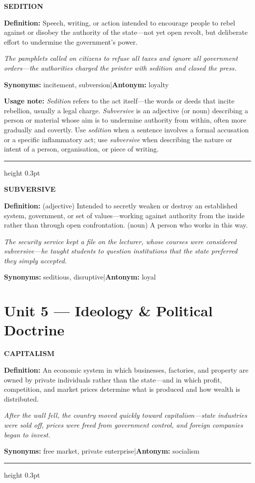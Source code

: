 \documentclass[11pt, a4paper]{article}
\newcommand{\wordentry}[2]{%
  \vspace{0.9em}%
  {\large\bfseries #1}%
  \quad{\itshape\color{posgray}(#2)}%
  \par\vspace{0.15em}%
}
\newcommand{\definition}[1]{%
  \textbf{Definition:} #1\par%
}
\newcommand{\examplesentence}[1]{%
  \begin{mdframed}[
    backgroundcolor=exampletan,
    linewidth=0pt,
    innerleftmargin=8pt,
    innerrightmargin=8pt,
    innertopmargin=5pt,
    innerbottommargin=5pt,
    skipabove=3pt,
    skipbelow=3pt
  ]
  \small\itshape #1
  \end{mdframed}%
}
\newcommand{\synantline}[2]{%
  \vspace{0.2em}%
  \textbf{Synonyms:} #1\quad|\quad\textbf{Antonym:} #2\par%
}
\newcommand{\usagenote}[1]{%
  \begin{mdframed}[
    backgroundcolor=notebg,
    linecolor=noteborder,
    linewidth=1pt,
    innerleftmargin=8pt,
    innerrightmargin=8pt,
    innertopmargin=5pt,
    innerbottommargin=5pt,
    skipabove=4pt,
    skipbelow=4pt
  ]
  \small\textbf{Usage note:} #1
  \end{mdframed}%
}
\newcommand{\entryrule}{%
  \vspace{0.3em}%
  {\color{posgray}\hrule height 0.3pt}%
  \vspace{0.3em}%
}
\begin{document}
\wordentry{SEDITION}{noun}
\definition{Speech, writing, or action intended to encourage people to rebel against or disobey the authority of the state---not yet open revolt, but deliberate effort to undermine the government's power.}
\examplesentence{The pamphlets called on citizens to refuse all taxes and ignore all government orders---the authorities charged the printer with sedition and closed the press.}
\synantline{incitement, subversion}{loyalty}

\usagenote{\textit{Sedition} refers to the act itself---the words or deeds that incite rebellion, usually a legal charge. \textit{Subversive} is an adjective (or noun) describing a person or material whose aim is to undermine authority from within, often more gradually and covertly. Use \textit{sedition} when a sentence involves a formal accusation or a specific inflammatory act; use \textit{subversive} when describing the nature or intent of a person, organisation, or piece of writing.}
\entryrule

\wordentry{SUBVERSIVE}{adjective / noun}
\definition{(adjective) Intended to secretly weaken or destroy an established system, government, or set of values---working against authority from the inside rather than through open confrontation. (noun) A person who works in this way.}
\examplesentence{The security service kept a file on the lecturer, whose courses were considered subversive---he taught students to question institutions that the state preferred they simply accepted.}
\synantline{seditious, disruptive}{loyal}

\newpage

\section*{Unit 5 \textnormal{---} Ideology \& Political Doctrine}

\wordentry{CAPITALISM}{noun}
\definition{An economic system in which businesses, factories, and property are owned by private individuals rather than the state---and in which profit, competition, and market prices determine what is produced and how wealth is distributed.}
\examplesentence{After the wall fell, the country moved quickly toward capitalism---state industries were sold off, prices were freed from government control, and foreign companies began to invest.}
\synantline{free market, private enterprise}{socialism}
\entryrule
\end{document}
